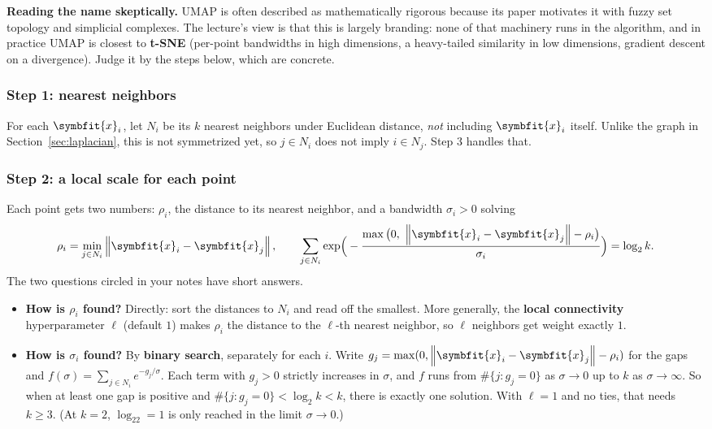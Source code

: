 \documentclass[11pt]{article}
\newcommand{\bm}[1]{\symbfit{#1}}
\newcommand{\vx}{\bm{x}}
\newcommand{\norm}[1]{\left\lVert #1\right\rVert}
\begin{document}
\begin{deeper}
\textbf{Reading the name skeptically.} UMAP is often described as mathematically rigorous because its paper motivates it with fuzzy set topology and simplicial
complexes. The lecture's view is that this is largely branding: none of that machinery runs in the algorithm, and in practice UMAP is
closest to \textbf{t-SNE} (per-point bandwidths in high dimensions, a heavy-tailed similarity in low dimensions, gradient descent on a divergence).
Judge it by the steps below, which are concrete.
\end{deeper}

\subsubsection*{Step 1: nearest neighbors}
For each $\vx_i$, let $N_i$ be its $k$ nearest neighbors under Euclidean distance, \emph{not} including $\vx_i$ itself.
Unlike the graph in Section~\ref{sec:laplacian}, this is not symmetrized yet, so $j\in N_i$ does not imply $i\in N_j$. Step 3 handles that.

\subsubsection*{Step 2: a local scale for each point}
Each point gets two numbers: $\rho_i$, the distance to its nearest neighbor, and a bandwidth $\sigma_i>0$ solving
\[
\rho_i=\min_{j\in N_i}\norm{\vx_i-\vx_j},\qquad
\sum_{j\in N_i}\exp\!\Big(-\frac{\max\big(0,\ \norm{\vx_i-\vx_j}-\rho_i\big)}{\sigma_i}\Big)=\log_2 k .
\]
The two questions circled in your notes have short answers.
\begin{itemize}[nosep]
\item \textbf{How is $\rho_i$ found?} Directly: sort the distances to $N_i$ and read off the smallest. More generally, the \textbf{local connectivity} hyperparameter
$\ell$ (default $1$) makes $\rho_i$ the distance to the $\ell$-th nearest neighbor, so $\ell$ neighbors get weight exactly $1$.
\item \textbf{How is $\sigma_i$ found?} By \textbf{binary search}, separately for each $i$. Write $g_j=\max(0,\norm{\vx_i-\vx_j}-\rho_i)$ for the gaps and
$f(\sigma)=\sum_{j\in N_i}e^{-g_j/\sigma}$. Each term with $g_j>0$ strictly increases in $\sigma$, and $f$ runs from $\#\{j:g_j=0\}$ as $\sigma\to0$ up to $k$
as $\sigma\to\infty$. So when at least one gap is positive and $\#\{j:g_j=0\}<\log_2k<k$, there is exactly one solution.
With $\ell=1$ and no ties, that needs $k\ge3$. (At $k=2$, $\log_22=1$ is only reached in the limit $\sigma\to0$.)
\end{itemize}
\end{document}
